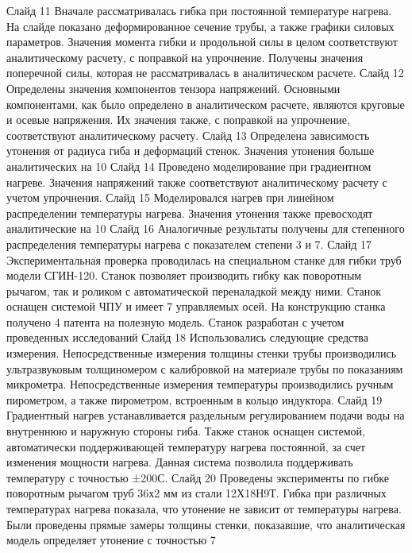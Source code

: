 Слайд 11
Вначале рассматривалась гибка при постоянной температуре нагрева. На слайде показано деформированное сечение трубы, а также графики силовых параметров. Значения момента гибки и продольной силы в целом соответствуют аналитическому расчету, с поправкой на упрочнение. Получены значения поперечной силы, которая не рассматривалась в аналитическом расчете.
Слайд 12
Определены значения компонентов тензора напряжений. Основными компонентами, как было определено в аналитическом расчете, являются круговые и осевые напряжения. Их значения также, с поправкой на упрочнение, соответствуют аналитическому расчету. 
Слайд 13
Определена зависимость утонения от радиуса гиба и деформаций стенок. Значения утонения больше аналитических на 10%
Слайд 14
Проведено моделирование при градиентном нагреве. Значения напряжений также соответствуют аналитическому расчету с учетом упрочнения.
Слайд 15
Моделировался нагрев при линейном распределении температуры нагрева. Значения утонения также превосходят аналитические на 10%
Слайд 16
Аналогичные результаты получены для степенного распределения температуры нагрева с показателем степени 3 и 7. 
Слайд 17
Экспериментальная проверка проводилась на специальном станке для гибки труб модели СГИН-120. Станок позволяет производить гибку как поворотным рычагом, так и роликом с автоматической переналадкой между ними. Станок оснащен системой ЧПУ и имеет 7 управляемых осей. На конструкцию станка получено 4 патента на полезную модель. Станок разработан с учетом проведенных исследований
Слайд 18
Использовались следующие средства измерения. Непосредственные измерения толщины стенки трубы производились ультразвуковым толщиномером с калибровкой на материале трубы по показаниям микрометра. Непосредственные измерения температуры производились ручным пирометром, а также пирометром, встроенным в кольцо индуктора.
Слайд 19
Градиентный нагрев устанавливается раздельным регулированием подачи воды на внутреннюю и наружную стороны гиба. Также станок оснащен системой, автоматически поддерживающей температуру нагрева постоянной, за счет изменения мощности нагрева. Данная система позволила поддерживать температуру с точностью ±200С.
Слайд 20
Проведены эксперименты по гибке поворотным рычагом труб 36х2 мм из стали 12Х18Н9Т. Гибка при различных температурах нагрева показала, что утонение не зависит от температуры нагрева. Были проведены прямые замеры толщины стенки, показавшие, что аналитическая модель определяет утонение с точностью 7%
